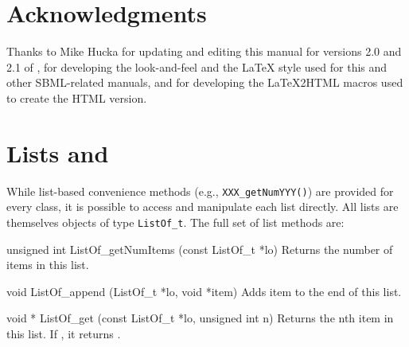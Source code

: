 \documentclass{sbmlmanual}
\begin{document}


\section{Acknowledgments}
\label{sec:acknowledgments}

Thanks to Mike Hucka for updating and editing this manual for versions 2.0
and 2.1 of \libsbml{}, for developing the look-and-feel and the LaTeX style
used for this and other SBML-related manuals, and for developing the
LaTeX2HTML macros used to create the HTML version.



\clearpage
\appendix
\section{Lists and }
\label{app:lists}

While list-based convenience methods (e.g., \texttt{XXX\_getNumYYY()}) are
provided for every class, it is possible to access and manipulate each list
directly.  All lists are themselves objects of type \texttt{ListOf\_t}.
The full set of list methods are:


\begin{methoddef}{unsigned int ListOf\_getNumItems (const ListOf\_t *lo)}
  Returns the number of items in this list.
\end{methoddef}


\begin{methoddef}{void ListOf\_append (ListOf\_t *lo, void *item)}
  Adds item to the end of this list.
\end{methoddef}


\begin{methoddef}{void * ListOf\_get (const ListOf\_t *lo, unsigned int n)}
  Returns the nth item in this list.  If ,
  it returns .
\end{methoddef}
\end{document}
